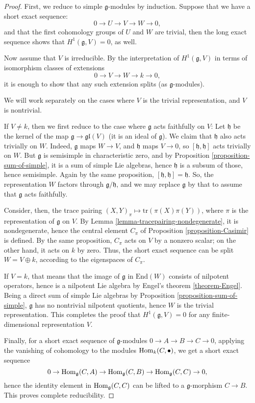 \begin{proof}
 First, we reduce to simple $\mathfrak g$-modules by induction. Suppose that we have a short exact sequence:
$$0\to U\to V\to W\to 0,$$
and that the first cohomology groups of $U$ and $W$ are trivial, then the long exact sequence shows that $H^1(\mathfrak g, V)=0$, as well.

Now assume that $V$ is irreducible. By the interpretation of $H^1(\mathfrak g, V)$ in terms of isomorphism classes of extensions 
$$ 0 \to V \to W \to k\to 0,$$
it is enough to show that any such extension splits (as $\mathfrak g$-modules).

We will work separately on the cases where $V$ is the trivial representation, and $V$ is nontrivial.

If $V\ne k$, then we first reduce to the case where $\mathfrak g$ acts faithfully on $V$: Let $\mathfrak h$ be the kernel of the map $\mathfrak g\to \mathfrak{gl}(V)$ (it is an ideal of $\mathfrak g$). We claim that $\mathfrak h$ also acts trivially on $W$. Indeed, $\mathfrak g$ maps $W\to V$, and $\mathfrak h$ maps $V\to 0$, so $[\mathfrak h,\mathfrak h]$ acts trivially on $W$. But $\mathfrak g$ is semisimple in characteristic zero, and by Proposition \ref{proposition-sum-of-simple}, it is a sum of simple Lie algebras, hence $\mathfrak h$ is a subsum of those, hence semisimple. Again by the same proposition, $[\mathfrak h,\mathfrak h] = \mathfrak h$. So, the representation $W$ factors through $\mathfrak g/\mathfrak h$, and we may replace $\mathfrak g$ by that to assume that $\mathfrak g$ acts faithfully.

Consider, then, the trace pairing $(X,Y)_\pi\mapsto \text{tr}(\pi(X)\pi(Y))$, where $\pi$ is the representation of $\mathfrak g$ on $V$. By Lemma \ref{lemma-tracepairing-nondegenerate}, it is nondegenerate, hence the central element $C_\pi$ of Proposition \ref{proposition-Casimir} is defined. By the same proposition, $C_\pi$ acts on $V$ by a nonzero scalar; on the other hand, it acts on $k$ by zero. Thus, the short exact sequence can be split $W=V\oplus k$, according to the eigenspaces of $C_\pi$. 

If $V=k$, that means that the image of $\mathfrak g$ in $\text{End}(W)$ consists of nilpotent operators, hence is a nilpotent Lie algebra by Engel's theorem \ref{theorem-Engel}. Being a direct sum of simple Lie algebras by Proposition \ref{proposition-sum-of-simple}, $\mathfrak g$ has no nontrivial nilpotent quotients, hence $W$ is the trivial representation. This completes the proof that $H^1(\mathfrak g, V)=0$ for any finite-dimensional representation $V$. 

Finally, for a short exact sequence of $\mathfrak g$-modules $0\to A \to B\to C \to 0$, applying the vanishing of cohomology to the modules $\mathop{\rm Hom}\nolimits_k(C, \bullet)$, we get a short exact sequence
$$ 0\to \mathop{\rm Hom}\nolimits_{\mathfrak g}(C,A)\to \mathop{\rm Hom}\nolimits_{\mathfrak g}(C,B) \to \mathop{\rm Hom}\nolimits_{\mathfrak g}(C,C) \to 0,$$
hence the identity element in $\mathop{\rm Hom}\nolimits_{\mathfrak g}(C,C)$ can be lifted to a $\mathfrak g$-morphism $C\to B$. This proves complete reducibility.
\end{proof}


